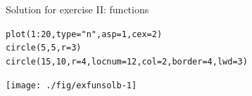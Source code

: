 \documentclass[xcolor=table,           xcolor=dvipsnames]{beamer}\usepackage[]{graphicx}\usepackage[]{color}
\makeatletter
\newcommand{\hlnum}[1]{\textcolor[rgb]{0,0,0}{#1}}
\newcommand{\hlstr}[1]{\textcolor[rgb]{0.545,0.137,0.137}{#1}}
\newcommand{\hlopt}[1]{\textcolor[rgb]{0,0,0}{#1}}
\newcommand{\hlstd}[1]{\textcolor[rgb]{0,0,0}{#1}}
\newcommand{\hlkwc}[1]{\textcolor[rgb]{1,0,1}{#1}}
\newcommand{\hlkwd}[1]{\textcolor[rgb]{0,0,1}{#1}}
\newenvironment{kframe}{%
 \def\at@end@of@kframe{}%
 \ifinner\ifhmode%
  \def\at@end@of@kframe{\end{minipage}}%
  \begin{minipage}{\columnwidth}%
 \fi\fi%
 \def\FrameCommand##1{\hskip\@totalleftmargin \hskip-\fboxsep
 \colorbox{shadecolor}{##1}\hskip-\fboxsep
     \hskip-\linewidth \hskip-\@totalleftmargin \hskip\columnwidth}%
 \MakeFramed {\advance\hsize-\width
   \@totalleftmargin\z@ \linewidth\hsize
   \@setminipage}}%
 {\par\unskip\endMakeFramed%
 \at@end@of@kframe}
\newenvironment{knitrout}{}{} %
\newcounter{exercisecount}
\makeatother
\begin{document}

\begin{frame}[fragile]{Solution for exercise  II: functions}
\begin{knitrout}
\color{fgcolor}\begin{kframe}
\begin{alltt}
\hlkwd{plot}\hlstd{(}\hlnum{1}\hlopt{:}\hlnum{20}\hlstd{,} \hlkwc{type}\hlstd{=}\hlstr{"n"}\hlstd{,} \hlkwc{asp}\hlstd{=}\hlnum{1}\hlstd{,} \hlkwc{cex}\hlstd{=}\hlnum{2}\hlstd{)}
\hlkwd{circle}\hlstd{(}\hlnum{5}\hlstd{,}\hlnum{5}\hlstd{,} \hlkwc{r}\hlstd{=}\hlnum{3}\hlstd{)}
\hlkwd{circle}\hlstd{(}\hlnum{15}\hlstd{,}\hlnum{10}\hlstd{,} \hlkwc{r}\hlstd{=}\hlnum{4}\hlstd{,} \hlkwc{locnum}\hlstd{=}\hlnum{12}\hlstd{,} \hlkwc{col}\hlstd{=}\hlnum{2}\hlstd{,} \hlkwc{border}\hlstd{=}\hlnum{4}\hlstd{,} \hlkwc{lwd}\hlstd{=}\hlnum{3}\hlstd{)}
\end{alltt}
\end{kframe}

{\centering \texttt{[image: ./fig/exfunsolb-1]} 

}



\end{knitrout}
\end{frame}

\end{document}
